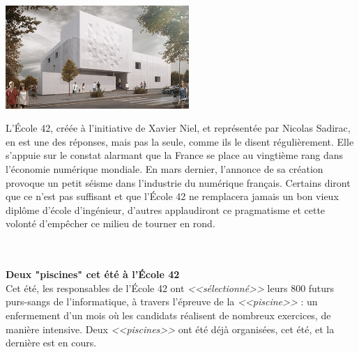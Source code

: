 \documentclass[11pt,twoside,a4paper]{article}
\begin{document}
\begin{minipage}[ht]{7.00cm}
	\includegraphics[width=6.95cm]{img/01-Exterieur.png}
\end{minipage} \hfill \begin{minipage}[ht]{0.65\textwidth}
	L'{\'E}cole 42, cr{\'e}{\'e}e {\`a} l'initiative de Xavier Niel, et repr{\'e}sent{\'e}e par Nicolas Sadirac, en est une des r{\'e}ponses, mais pas la seule, comme ils le disent r{\'e}guli{\`e}rement. Elle s'appuie sur le constat alarmant que la France se place au vingti{\`e}me rang dans l'{\'e}conomie num{\'e}rique mondiale. En mars dernier, l'annonce de sa cr{\'e}ation provoque un petit s{\'e}isme dans l'industrie du num{\'e}rique fran\c{c}ais. Certains diront que ce n'est pas suffisant et que l'{\'E}cole 42 ne remplacera jamais un bon vieux dipl{\^o}me d'{\'e}cole d'ing{\'e}nieur, d'autres applaudiront ce pragmatisme et cette volont{\'e} d'emp{\^e}cher ce milieu de tourner en rond. %
\end{minipage}~\\~\\

\textbf{\large Deux "piscines" cet {\'e}t{\'e} {\`a} l'{\'E}cole 42}~\\

	Cet {\'e}t{\'e}, les responsables de l'{\'E}cole 42 ont \emph{<<s{\'e}lectionn{\'e}>>} leurs 800 futurs purs-sangs de l'informatique, {\`a} travers l'{\'e}preuve de la \emph{<<piscine>>} : un enfermement d'un mois o{\`u} les candidats r{\'e}alisent de nombreux exercices, de mani{\`e}re intensive. Deux \emph{<<piscines>>} ont {\'e}t{\'e} d{\'e}j{\`a} organis{\'e}es, cet {\'e}t{\'e}, et la derni{\`e}re est en cours. ~\\
\end{document}
